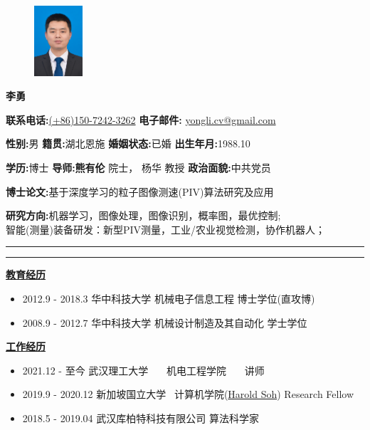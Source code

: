 \documentclass[a4paper,fontsize=11pt]{scrartcl} %
\newcommand{\name}[1]{ %
\noindent\Large\textbf{#1}\normalsize\par}
\newcommand{\bfill}[1]{
	\makebox[#1]{\hfil}}
\newcommand{\stitle}[1]{
	\noindent\underline{\textbf{#1}} \normalsize\par}
\begin{document}
\begin{figure} %
	\vspace*{-0.42cm}
    \hfil\includegraphics[width=0.16\textwidth]{yong.jpg}
\end{figure}

\name{李\quad 勇}
\noindent \textbf{联系电话:}\href{tel:+8615072423262}{(+86)150-7242-3262} \bfill{1.25cm}
\textbf{电子邮件:} \href{mailto:yongli.cv@gmail.com}{yongli.cv@gmail.com}

\noindent \textbf{性别:}男 \bfill{1.2cm}
\textbf{籍贯:}湖北恩施 \bfill{0.75cm}
\textbf{婚姻状态:}已婚 \bfill{0.2cm}
\textbf{出生年月:}1988.10

\noindent \textbf{学历:}博士 \bfill{0.8cm}
\textbf{导师:熊有伦} 院士， 杨华 教授 \bfill{1.48cm}
\textbf{政治面貌:}中共党员 

\noindent \textbf{博士论文:}基于深度学习的粒子图像测速(PIV)算法研究及应用

\noindent \textbf{研究方向:}机器学习，图像处理，图像识别，概率图，最优控制;\\
\bfill{0.66cm}智能(测量)装备研发：新型PIV测量，工业/农业视觉检测，协作机器人； 

\vspace{0.1cm}
\hrule height 0.05cm 
\vspace{0.05cm}
\hrule
\vspace{0.05cm}

\stitle{教育经历}
\begin{itemize}
	\setlength\itemsep{0.0cm}
	\item  2012.9 - 2018.3 \bfill{1cm} 
			华中科技大学 \bfill{1cm}
			机械电子信息工程\bfill{1.4cm}
			博士学位(直攻博)
	\item  2008.9 - 2012.7 \bfill{1cm}
			华中科技大学 \bfill{1cm} 
			机械设计制造及其自动化\bfill{1.7cm}
			学士学位
\end{itemize}

\stitle{工作经历}
\begin{itemize}
	\setlength\itemsep{0.0cm}
	\item 2021.12 - 至今 \bfill{1.1cm}
			武汉理工大学~~~\bfill{0.9cm}
			机电工程学院~~~\bfill{1.8cm}
			讲师
	\item 2019.9 - 2020.12 \bfill{0.8cm}
			新加坡国立大学~\bfill{0.7cm}
			计算机学院(\href{https://haroldsoh.com/}{Harold Soh})\bfill{0.4cm}
			Research Fellow
 	\item 2018.5 - 2019.04\bfill{0.9cm}
			武汉库柏特科技有限公司\bfill{3.8cm}
			算法科学家
\end{itemize}
\end{document}
